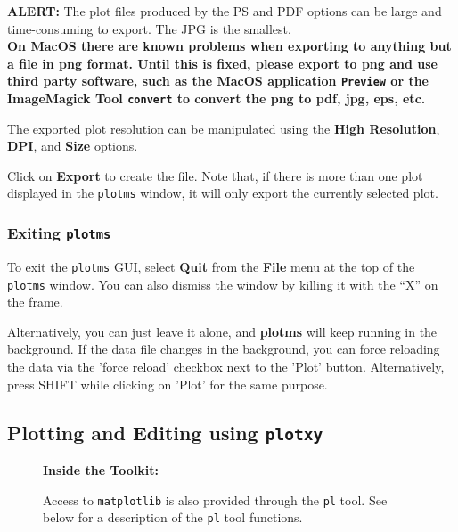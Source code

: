 {\bf ALERT:} The plot files produced by the PS and PDF options can be
large and time-consuming to export.  The JPG is the smallest.\\ 
{\bf On
  MacOS there are known problems when exporting to anything but a file
  in png
  format. Until this is fixed, please export to png and use third
  party software, such as the MacOS
  application {\tt Preview} or the ImageMagick Tool {\tt convert} to
  convert the png to pdf, jpg, eps, etc. }

The exported plot resolution can be manipulated using the {\bf High Resolution}, {\bf DPI}, and {\bf Size} options.

Click on {\bf Export} to create the file. Note that, if there is more
than one plot displayed in the {\tt plotms} window,
it will only export the currently selected plot.

\subsubsection{Exiting {\tt plotms}}
\label{section:edit.plot.plotms.exit}

To exit the {\tt plotms} GUI, select {\bf Quit} from the {\bf File} menu at the top of the {\tt plotms} window. You can also dismiss the window by killing it with the ``X'' on the frame.

Alternatively, you can just leave it alone, and {\bf plotms} will keep
running in the background. If the data file changes in the background,
you can force reloading the data via the 'force reload' checkbox
next to the 'Plot' button. Alternatively, press SHIFT while clicking
on 'Plot' for the same purpose.








\subsection{Plotting and Editing using {\tt plotxy}}
\label{section:edit.plot.plotxy}


\begin{wrapfigure}{r}{2.5in}
  \begin{boxedminipage}{2.5in}
     \centerline{\bf Inside the Toolkit:}
     Access to {\tt matplotlib} is also provided through 
     the {\tt pl} tool. 
     See below for a description of the {\tt pl} tool functions. 
  \end{boxedminipage}
\end{wrapfigure}

